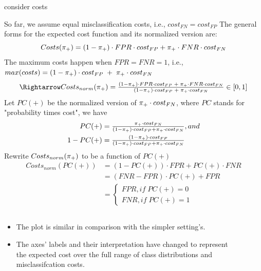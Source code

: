 
\begin{vbframe}{consider costs}
	
So far, we assume equal misclassification costs, i.e., $cost_{FN}=cost_{FP}$
The general forms for the expected cost function and its normalized version are:
$$Costs(\pi_{+}) = (1 - \pi_{+}) \cdot FPR \cdot cost_{FP} + \pi_{+} \cdot FNR \cdot cost_{FN}$$
The maximum costs happen when $FPR=FNR=1$, i.e., $max(costs) = (1 - \pi_{+}) \cdot cost_{FP} \; + \; \pi_{+} \cdot cost_{FN}$
$$\Rightarrow Costs_{norm}(\rp) = \tfrac{(1 - \rp) \cdot FPR \cdot cost_{FP} \; + \; \rp \cdot FNR \cdot cost_{FN}}{(1 - \rp) \cdot cost_{FP} \; + \; \rp \cdot cost_{FN}} \in [0,1]$$
Let $PC(+)$ be the normalized version of $\pi_{+}\cdot cost_{FN}$, where $PC$ stands for "probability times cost", we have
\begin{align*}
  PC(+)&=\tfrac{\pi_{+}\cdot cost_{FN}}{(1-\pi_{+})\cdot cost_{FP} + \pi_{+}\cdot cost_{FN}}, and \\
  1-PC(+)&=\tfrac{(1-\pi_{+})\cdot cost_{FP}}{(1-\pi_{+})\cdot cost_{FP} + \pi_{+}\cdot cost_{FN}}
\end{align*}
Rewrite $Costs_{norm}(\pi_{+})$ to be a function of $PC(+)$
\begin{align*}
Costs_{norm}(PC(+)) &= (1-PC(+))\cdot FPR + PC(+)\cdot FNR \\
&= (FNR - FPR)\cdot PC(+) + FPR \\
&= \begin{cases}
  FPR, if\; PC(+) = 0 \\
  FNR, if\; PC(+) = 1
\end{cases}
\end{align*}
\vspace{-0.8cm}
\begin{columns}[T]
\begin{column}{0.5\textwidth}
\begin{itemize}
  \item The plot is similar in comparison with the simpler setting's.
  \item The axes' labels and their interpretation have changed to represent the expected cost over the full range of class distributions and misclassifcation costs.
\end{itemize}
\end{column}
\begin{column}{0.5\textwidth}
\begin{figure}
  \centering

\end{figure}
\end{column}
\end{columns}
\end{vbframe}
